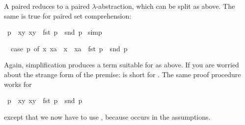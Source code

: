 \begin{isabellebody}
\begin{isamarkuptxt}
A paired  reduces to a paired $\lambda$-abstraction, which
can be split as above. The same is true for paired set comprehension:%
\end{isamarkuptxt}%
\isamarkuptrue%
%
\endisatagproof
{\isafoldproof}%
%
\isadelimproof
%
\endisadelimproof
{}\isamarkupfalse%
\ {}p\ {}\ {}{}x{}y{}{}\ x{}y{}\ {}\ fst\ p\ {}\ snd\ p{}\isanewline
%
\isadelimproof
%
\endisadelimproof
%
\isatagproof
{}\isamarkupfalse%
\ simp%
\begin{isamarkuptxt}%
\begin{isabelle}%
\ {}{}\ {}case\ p\ of\ {}x{}\ xa{}\ {}\ x\ {}\ xa{}\ {}\ fst\ p\ {}\ snd\ p%
\end{isabelle}
Again, simplification produces a term suitable for 
as above. If you are worried about the strange form of the premise:
 is short for .
The same proof procedure works for%
\end{isamarkuptxt}%
\isamarkuptrue%
%
\endisatagproof
{\isafoldproof}%
%
\isadelimproof
%
\endisadelimproof
{}\isamarkupfalse%
\ {}p\ {}\ {}{}x{}y{}{}\ x{}y{}\ {}\ fst\ p\ {}\ snd\ p{}%
\isadelimproof
%
\endisadelimproof
%
\isatagproof
%
\begin{isamarkuptxt}%
\noindent
except that we now have to use , because
 occurs in the assumptions.


\end{isamarkuptxt}
\end{isabellebody}
